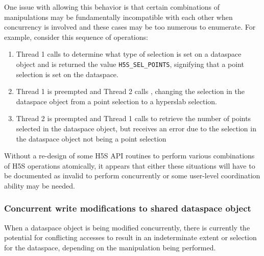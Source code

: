 \documentclass[../HDF5_RFC.tex]{subfiles}
\begin{document}
One issue with allowing this behavior is that certain combinations of manipulations may
be fundamentally incompatible with each other when concurrency is involved and these
cases may be too numerous to enumerate. For example, consider this sequence of operations:

\begin{enumerate}
    \item Thread 1 calls  to determine what type
          of selection is set on a dataspace object and is returned the value
          \texttt{H5S\_SEL\_POINTS}, signifying that a point selection is set on the dataspace.
    \item Thread 1 is preempted and Thread 2 calls ,
          changing the selection in the dataspace object from a point selection to a hyperslab
          selection.
    \item Thread 2 is preempted and Thread 1 calls 
          to retrieve the number of points selected in the dataspace object, but receives
          an error due to the selection in the dataspace object not being a point selection
\end{enumerate}

Without a re-design of some H5S API routines to perform various combinations of H5S operations
atomically, it appears that either these situations will have to be documented as invalid to
perform concurrently or some user-level coordination ability may be needed.

\subsubsection{Concurrent write modifications to shared dataspace object}
\label{h5s_concurrent_write}

When a dataspace object is being modified concurrently, there is currently the potential
for conflicting accesses to result in an indeterminate extent or selection for the dataspace,
depending on the manipulation being performed.
\end{document}
